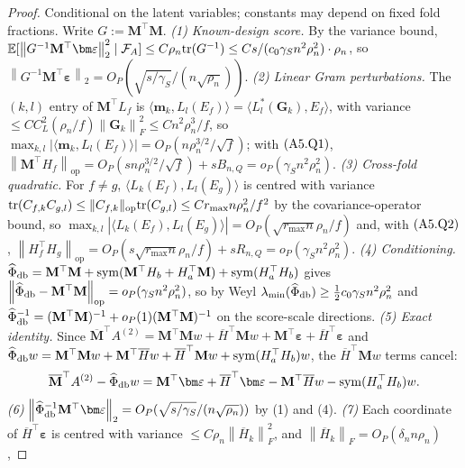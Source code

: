 \documentclass[12pt]{article}
\newcommand{\E}{\mathbb{E}}
\newcommand{\1}{\mathbf{1}}
\newcommand{\norm}[1]{\left\lVert#1\right\rVert}
\providecommand{\op}{\operatorname{op}}
\providecommand{\sym}{\operatorname{sym}}
\begin{document}
\begin{proof}
Conditional on the latent variables; constants may depend on fixed fold fractions. Write $G:=\mathbf
M^\top\mathbf M$. \emph{(1) Known-design score.} By the variance bound, $\E[\norm{G^{-1}\mathbf
M^\top\bm\varepsilon}_2^2\mid\mathcal F_A]\le C\rho_n{\rm tr}(G^{-1})\le Cs/(c_0\gamma_S
n^2\rho_n^2)\cdot\rho_n$, so $\norm{G^{-1}\mathbf M^\top\bm\varepsilon}_2=O_P(\sqrt{s/\gamma_S}/(n\sqrt{\rho_n}))$.
\emph{(2) Linear Gram perturbations.} The $(k,l)$ entry of $\mathbf M^\top L_f$ is $\langle\mathbf
m_k,L_l(E_f)\rangle=\langle L_l^*(\mathbf G_k),E_f\rangle$, with variance $\le CC_L^2(\rho_n/f)\norm{\mathbf
G_k}_F^2\le Cn^2\rho_n^3/f$, so $\max_{k,l}|\langle\mathbf m_k,L_l(E_f)\rangle|=O_P(n\rho_n^{3/2}/\sqrt
f)$; with $({\rm A5.Q1})$, $\norm{\mathbf M^\top H_f}_{\op}=O_P(sn\rho_n^{3/2}/\sqrt
f)+sB_{n,Q}=o_P(\gamma_S n^2\rho_n^2)$. \emph{(3) Cross-fold quadratic.} For $f\ne g$,
$\langle L_k(E_f),L_l(E_g)\rangle$ is centred with variance ${\rm tr}(C_{f,k}C_{g,l})\le\|C_{f,k}\|_{\op}{\rm
tr}(C_{g,l})\le Cr_{\max}n\rho_n^2/f^2$ by the covariance-operator bound, so $\max_{k,l}|\langle
L_k(E_f),L_l(E_g)\rangle|=O_P(\sqrt{r_{\max}n}\rho_n/f)$ and, with $({\rm A5.Q2})$,
$\norm{H_f^\top H_g}_{\op}=O_P(s\sqrt{r_{\max}n}\rho_n/f)+sR_{n,Q}=o_P(\gamma_S n^2\rho_n^2)$.
\emph{(4) Conditioning.} $\widehat\Phi_{\rm db}=\mathbf M^\top\mathbf M+\sym(\mathbf M^\top
H_b+H_a^\top\mathbf M)+\sym(H_a^\top H_b)$ gives $\norm{\widehat\Phi_{\rm db}-\mathbf M^\top\mathbf
M}_{\op}=o_P(\gamma_S n^2\rho_n^2)$, so by Weyl $\lambda_{\min}(\widehat\Phi_{\rm
db})\ge\tfrac12c_0\gamma_S n^2\rho_n^2$ and $\widehat\Phi_{\rm db}^{-1}=(\mathbf M^\top\mathbf
M)^{-1}+o_P(1)(\mathbf M^\top\mathbf M)^{-1}$ on the score-scale directions. \emph{(5) Exact
identity.} Since $\overline{\mathbf M}^\top A^{(2)}=\mathbf M^\top\mathbf Mw+\overline H^\top\mathbf
Mw+\mathbf M^\top\bm\varepsilon+\overline H^\top\bm\varepsilon$ and $\widehat\Phi_{\rm db}w=\mathbf
M^\top\mathbf Mw+\mathbf M^\top\overline Hw+\overline H^\top\mathbf Mw+\sym(H_a^\top H_b)w$, the
$\overline H^\top\mathbf Mw$ terms cancel:
\[
        \overline{\mathbf M}^\top A^{(2)}-\widehat\Phi_{\rm db}w=\mathbf M^\top\bm\varepsilon+\overline
        H^\top\bm\varepsilon-\mathbf M^\top\overline Hw-\sym(H_a^\top H_b)w .
\]
\emph{(6)} $\norm{\widehat\Phi_{\rm db}^{-1}\mathbf M^\top\bm\varepsilon}_2=O_P(\sqrt{s/\gamma_S}/(n\sqrt{\rho_n}))$
by (1) and (4). \emph{(7)} Each coordinate of $\overline H^\top\bm\varepsilon$ is centred with
variance $\le C\rho_n\norm{\overline H_k}_F^2$, and $\norm{\overline H_k}_F=O_P(\delta_n n\rho_n)$,

\end{proof}
\end{document}
